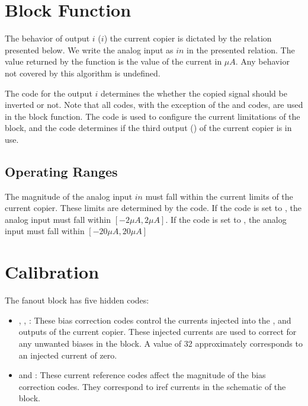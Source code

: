  
\section{Block Function}\label{fanout:blockfun}
The behavior of output $i$ ($i$) the current copier is dictated by the
relation presented below. We write the analog input as $in$ in the presented
relation. The value returned by the function is the value of the current in $\mu
A$. Any behavior not covered by this algorithm is undefined.

\begin{algorithmic}
  \EndIf
\end{algorithmic}

The  code for the output $i$ determines the whether the copied signal
should be inverted or not. Note that all \static codes, with the exception of
the  and  codes, are used in the block function. The  code is
used to configure the current limitations of the block, and the  code
determines if the third output () of the current copier is in use.

\subsection{Operating Ranges}

The magnitude of the analog input $in$ must fall within the current limits of
the current copier. These limits are determined by the  code. If the
 code is set to , the analog input must fall within
$[-2 \mu A, 2 \mu A]$. If the  code is set to , the
analog input must fall within $[-20 \mu A, 20 \mu A]$

\section{Calibration}\label{fanout:calib}

The fanout block has five hidden codes:

\begin{itemize}
\item{}, , : These bias
  correction codes control the currents injected into
  the ,  and  outputs of the current copier. These
  injected currents are used to correct for any unwanted biases in the block. A
   value of 32 approximately corresponds to an injected current of zero.
\item{} and : These current reference codes affect the magnitude of the
  bias correction codes. They correspond to iref currents in the schematic of
  the block. 
\end{itemize}

